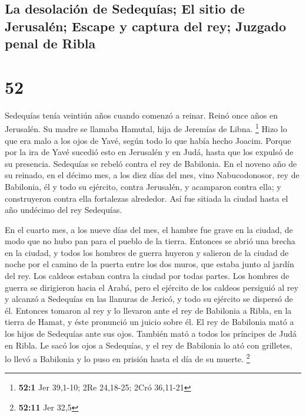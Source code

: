 \begin{paracol}{2}
\hypertarget{la-desolaciuxf3n-de-sedequuxedas-el-sitio-de-jerusaluxe9n-escape-y-captura-del-rey-juzgado-penal-de-ribla}{%
\subsection{La desolación de Sedequías; El sitio de Jerusalén; Escape y
captura del rey; Juzgado penal de
Ribla}\label{la-desolaciuxf3n-de-sedequuxedas-el-sitio-de-jerusaluxe9n-escape-y-captura-del-rey-juzgado-penal-de-ribla}}

\hypertarget{section-102}{%
\section{52}\label{section-102}}

 Sedequías tenía veintiún años cuando comenzó a reinar.
Reinó once años en Jerusalén. Su madre se llamaba Hamutal, hija de
Jeremías de Libna. \footnote{\textbf{52:1} Jer 39,1-10; 2Re 24,18-25;
  2Cró 36,11-21}  Hizo lo que era malo a los ojos de Yavé,
según todo lo que había hecho Joacim.  Porque por la ira
de Yavé sucedió esto en Jerusalén y en Judá, hasta que los expulsó de su
presencia. Sedequías se rebeló contra el rey de Babilonia.
 En el noveno año de su reinado, en el décimo mes, a los
diez días del mes, vino Nabucodonosor, rey de Babilonia, él y todo su
ejército, contra Jerusalén, y acamparon contra ella; y construyeron
contra ella fortalezas alrededor.  Así fue sitiada la
ciudad hasta el año undécimo del rey Sedequías.

 En el cuarto mes, a los nueve días del mes, el hambre fue
grave en la ciudad, de modo que no hubo pan para el pueblo de la tierra.
 Entonces se abrió una brecha en la ciudad, y todos los
hombres de guerra huyeron y salieron de la ciudad de noche por el camino
de la puerta entre los dos muros, que estaba junto al jardín del rey.
Los caldeos estaban contra la ciudad por todas partes. Los hombres de
guerra se dirigieron hacia el Arabá,  pero el ejército de
los caldeos persiguió al rey y alcanzó a Sedequías en las llanuras de
Jericó, y todo su ejército se dispersó de él.  Entonces
tomaron al rey y lo llevaron ante el rey de Babilonia a Ribla, en la
tierra de Hamat, y éste pronunció un juicio sobre él.  El
rey de Babilonia mató a los hijos de Sedequías ante sus ojos. También
mató a todos los príncipes de Judá en Ribla.  Le sacó los
ojos a Sedequías, y el rey de Babilonia lo ató con grilletes, lo llevó a
Babilonia y lo puso en prisión hasta el día de su muerte. \footnote{\textbf{52:11}
  Jer 32,5}


\end{paracol}
